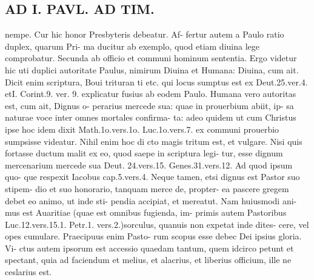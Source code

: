 \documentclass{article}
\begin{document}
\begin{pages}
\section*{AD I. PAVL. AD TIM. }
\marginpar{[ p.310 ]}nempe. Cur hic honor Presbyteris debeatur. Af- fertur autem a Paulo ratio duplex, quarum Pri- ma ducitur ab exemplo, quod etiam diuina lege comprobatur. Secunda ab officio et communi hominum sententia. Ergo videtur hic uti duplici autoritate Paulus, nimirum Diuina et Humana: Diuina, cum ait. Dicit enim scriptura, Boui trituran ti etc. qui locus sumptus est ex Deut.25.ver.4. etI. Corint.9. ver. 9. explicatur fusius ab eodem Paulo. Humana vero autoritas est, cum ait, Dignus o- perarius mercede sua: quae in prouerbium abiit, ip- sa naturae voce inter omnes mortales confirma- ta: adeo quidem ut cum Christus ipse hoc idem dixit Math.1o.vers.1o. Luc.1o.vers.7. ex communi prouerbio sumpsisse videatur. Nihil enim hoc di cto magis tritum est, et vulgare. Nisi quis fortasse ductum malit ex eo, quod saepe in scriptura legi- tur, esse dignum mercenarium mercede sua Deut. 24.vers.15. Genes.31.vers.12. Ad quod ipsum quo- que respexit Iacobus cap.5.vers.4. Neque tamen, etsi dignus est Pastor suo stipem- dio et suo honorario, tanquam merce de, propter- ea pascere gregem debet eo animo, ut inde sti- pendia accipiat, et mereatut. Nam huiusmodi ani- mus est Auaritiae (quae est omnibus fugienda, im- primis autem Pastoribus Luc.12.vers.15.1. Petr.1. vers.2.)sorculus, quanuis non expetat inde dites- cere, vel opes cumulare. Praecipuus enim Pasto- rum scopus esse debec Dei ipsius gloria. Vi- ctus autem ipsorum est accessio quaedam tantum, quem idcirco petunt et spectant, quia ad faciendum et melius, et alacrius, et liberius officium, ille ne ceslarius est. 

\end{pages}
\end{document}
